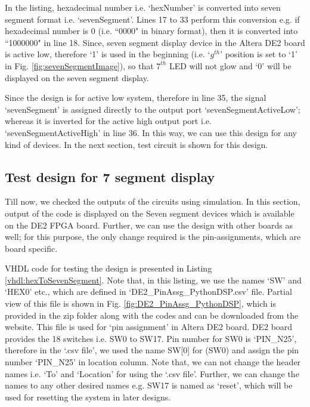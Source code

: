 \begin{explanation}
	In the listing, hexadecimal number i.e. `hexNumber' is converted into seven segment format i.e. `sevenSegment'. Lines 17 to 33 perform this conversion e.g. if hexadecimal number is 0 (i.e. ``0000" in binary format),  then it is converted into ``1000000" in line 18. Since, seven segment display device in the Altera DE2 board is active low, therefore `1' is used in the beginning (i.e. `$g^{th}$' position is set to `1' in Fig. \ref{fig:sevenSegmentImage}),  so that $7^{th}$ LED will not glow and `0' will be displayed on the seven segment display. 
	
	Since the design is for active low system, therefore in line 35, the signal `sevenSegment' is assigned directly to the output port `sevenSegmentActiveLow'; whereas it is inverted for the active high output port i.e. `sevenSegmentActiveHigh' in line 36. In this way, we can use this design for any kind of devices. In the next section, test circuit is shown for this design.
\end{explanation}


\subsection{Test design for 7 segment display}
Till now, we checked the outputs of the circuits using simulation. In this section, output of the code is displayed on the Seven segment devices which is available on the DE2 FPGA board. Further, we can use the design with other boards as well; for this purpose, the only change required is the pin-assignments, which are board specific.  

VHDL code for testing the design is presented in Listing \ref{vhdl:hexToSevenSegment}. Note that, in this listing, we use the names `SW' and `HEX0' etc., which are defined in `DE2\_PinAssg\_PythonDSP.csv' file. Partial view of this file is shown in Fig. \ref{fig:DE2_PinAssg_PythonDSP}, which is provided in the zip folder along with the codes and can be downloaded from the website. This file is used for `pin assignment' in Altera DE2 board. DE2 board provides the 18 switches i.e. SW0 to SW17. Pin number for SW0 is `PIN\_N25', therefore in the `.csv file', we used the name SW[0] for (SW0) and assign the pin number `PIN\_N25' in location column. Note that, we can not change the header names i.e. `To' and `Location' for using the `.csv file'. Further, we can change the names to any other desired names e.g. SW17 is named as `reset', which will be used for resetting the system in later designs. 

